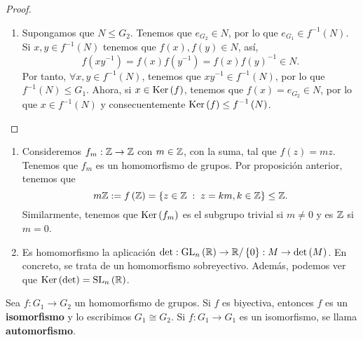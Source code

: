 \begin{proof}
\begin{enumerate}
\item Supongamos que $\displaystyle N \leq G_{2} $. Tenemos que $\displaystyle e_{G_{2}} \in N $, por lo que $\displaystyle e_{G_{1}} \in f^{-1}\left(N\right) $. Si $\displaystyle x,y \in f^{-1}\left(N\right) $ tenemos que $\displaystyle f\left(x\right), f\left(y\right) \in N $, así, 
	\[f\left(xy^{-1}\right)= f\left(x\right)f\left(y^{-1}\right) = f\left(x\right) f\left(y\right)^{-1} \in N .\]
	Por tanto, $\displaystyle \forall x,y \in f^{-1}\left(N\right) $, tenemos que $\displaystyle xy^{-1} \in f^{-1}\left(N\right) $, por lo que $\displaystyle f^{-1}\left(N\right) \leq G_{1} $. Ahora, si $\displaystyle x \in \operatorname{Ker}\left(f\right) $, tenemos que $\displaystyle f\left(x\right) = e_{G_{2}} \in N $, por lo que $\displaystyle x \in f^{-1}\left(N\right) $ y consecuentemente $\displaystyle \operatorname{Ker}\left(f\right) \leq f^{-1}\left(N\right) $.
\end{enumerate}
\end{proof}
\begin{eg}
\begin{enumerate}
	\item Consideremos $\displaystyle f_{m} : \mathbb{Z} \to \mathbb{Z} $ con $\displaystyle m \in \mathbb{Z} $, con la suma, tal que $\displaystyle f\left(z\right) = mz $. Tenemos que $\displaystyle f_{m} $ es un homomorfismo de grupos. Por proposición anterior, tenemos que 
		\[ m\mathbb{Z} := f\left(\mathbb{Z}\right)= \left\{ z \in \mathbb{Z} \; : \; z = km, k \in \mathbb{Z}\right\}  \leq \mathbb{Z} .\]
	Similarmente, tenemos que $\displaystyle \operatorname{Ker}\left(f_{m}\right) $ es el subgrupo trivial si $\displaystyle m \neq 0 $ y es $\displaystyle \mathbb{Z} $ si $\displaystyle m = 0 $.	
\item Es homomorfismo la aplicación $\displaystyle \det : \operatorname{GL}_{n}\left(\mathbb{R}\right) \to \mathbb{R} / \left\{ 0\right\}  : M \to \det\left(M\right) $. En concreto, se trata de un homomorfismo sobreyectivo. Además, podemos ver que $\displaystyle \operatorname{Ker}\left(\det \right) = \operatorname{SL}_{n}\left(\mathbb{R}\right) $.
\end{enumerate}
\end{eg}
\begin{definition}
Sea $\displaystyle f : G_{1} \to G_{2} $ un homomorfismo de grupos. Si $\displaystyle f $ es biyectiva, entonces $\displaystyle f $ es un \textbf{isomorfismo} y lo escribimos $\displaystyle G_{1} \cong G_{2} $. Si $\displaystyle f : G_{1} \to G_{1} $ es un isomorfismo, se llama \textbf{automorfismo}.
\end{definition}
